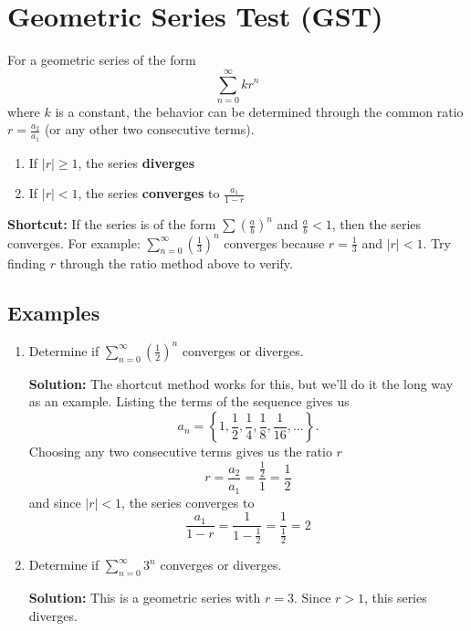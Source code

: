 \documentclass[12pt]{report}
\begin{document}
\clearpage




\section{Geometric Series Test (GST)}
\label{geometric_series_test}
For a geometric series of the form
    $$\sum_{n=0}^{\infty} kr^n$$
where $k$ is a constant, the behavior can be determined through the common ratio $r = \frac{a_2}{a_1}$ (or any other two consecutive terms).
\begin{enumerate}
    \item If $|r| \geq 1$, the series \textbf{diverges}
    \item If $|r| < 1$, the series \textbf{converges} to $\frac{a_1}{1-r}$
\end{enumerate}



\noindent\textbf{Shortcut:} If the series is of the form $\sum \left( \frac{a}{b} \right)^n$ and $\frac{a}{b} < 1$, then the series converges. For example: $\sum_{n=0}^{\infty} \left( \frac{1}{3} \right)^n$ converges because $r = \frac{1}{3}$ and $|r| < 1$. Try finding $r$ through the ratio method above to verify.

\subsection*{Examples}

\begin{enumerate}
    \item Determine if $\sum_{n=0}^{\infty} \left( \frac{1}{2} \right)^n$ converges or diverges.
    
    \textbf{Solution:} The shortcut method works for this, but we'll do it the long way as an example. Listing the terms of the sequence gives us
        $$a_n = \left\{1, \frac{1}{2}, \frac{1}{4}, \frac{1}{8}, \frac{1}{16}, ... \right\}.$$
    Choosing any two consecutive terms gives us the ratio $r$
        $$r= \frac{a_2}{a_1} = \frac{\frac{1}{2}}{1} = \frac{1}{2}$$
    and since $|r| < 1$, the series converges to 
        $$\frac{a_1}{1-r} = \frac{1}{1-\frac{1}{2}} = \frac{1}{\frac{1}{2}} = 2$$
    
    
    
        
    \item Determine if $\sum_{n=0}^{\infty} 3^n$ converges or diverges. 
    
    \textbf{Solution:} This is a geometric series with $r = 3$. Since $r > 1$, this series diverges.
\end{enumerate}
\end{document}
